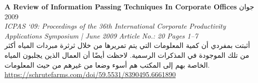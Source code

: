\foreignlanguage{english}{\textbf{A Review of Information Passing Techniques In Corporate Offices}} \hfill جوان 2009\\
\foreignlanguage{english}{\textit{ICPAS ‘09: Proceedings of the 36th International Corporate Productivity Applications Symposium | June 2009 Article No.: 20 Pages 1–7}}\\
أثبتت بمفردي أن كمية المعلومات التي يتم تمريرها من خلال ثرثرة مبردات المياه أكثر من تلك الموجودة في المذكرات الرسمية. لاحظت أيضًا أن العمال الذين يجلبون المياه الخاصة بهم إلى المكتب هم أسوء وضعا من غيرهم من حيث المعلومات.
\foreignlanguage{english}{\href{https://schrutefarms.com/doi/59.5531/8390495.6661890}{https://schrutefarms.com/doi/59.5531/8390495.6661890}}
\vspace*{2mm}